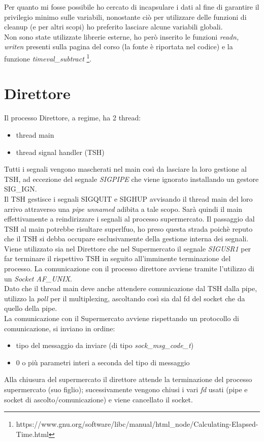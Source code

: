 \documentclass[11pt, a4paper]{article}
\begin{document}
Per quanto mi fosse possibile ho cercato di incapsulare i dati al fine di garantire il privilegio minimo sulle variabili, nonostante ciò per utilizzare delle funzioni di cleanup (e per altri scopi) ho preferito lasciare alcune variabili globali.\\
Non sono state utilizzate librerie esterne, ho però inserito le funzioni \textit{readn, writen} presenti sulla pagina del corso (la fonte è riportata nel codice) e la funzione \textit{timeval\_subtract} \footnote{https://www.gnu.org/software/libc/manual/html\_node/Calculating-Elapsed-Time.html}.

\section{Direttore}
Il processo Direttore, a regime, ha 2 thread:
\begin{itemize}
\item thread main 
\item thread signal handler (TSH)
\end{itemize}
Tutti i segnali vengono mascherati nel main così da lasciare la loro gestione al TSH, ad eccezione del segnale \textit{SIGPIPE} che viene ignorato installando un gestore SIG\_IGN.\\
Il TSH gestisce i segnali SIGQUIT e SIGHUP avvisando il thread main del loro arrivo attraverso una \textit{pipe unnamed} adibita a tale scopo. Sarà quindi il main effettivamente a reindirizzare i segnali al processo supermercato. Il passaggio dal TSH al main potrebbe risultare superlfuo, ho preso questa strada poichè reputo che il TSH si debba occupare esclusivamente della gestione interna dei segnali.\\
Viene utilizzato sia nel Direttore che nel Supermercato il segnale \textit{SIGUSR1} per far terminare il rispettivo TSH in seguito all'imminente terminazione del processo.
La comunicazione con il processo direttore avviene tramite l'utilizzo di un \textit{Socket AF\_UNIX}.\\
Dato che il thread main deve anche attendere comunicazione dal TSH dalla pipe, utilizzo la \textit{poll} per il multiplexing, ascoltando così sia dal fd del socket che da quello della pipe.\\
La comunicazione con il Supermercato avviene rispettando un protocollo di comunicazione, si inviano in ordine:
\begin{itemize}
\item tipo del messaggio da inviare (di tipo \textit{sock\_msg\_code\_t})
\item 0 o più parametri interi a seconda del tipo di messaggio
\end{itemize}
Alla chiusura del supermercato il direttore attende la terminazione del processo supermercato (suo figlio); sucessivamente vengono chiusi i vari \textit{fd} usati (pipe e socket di ascolto/comunicazione) e viene cancellato il socket.
\end{document}
